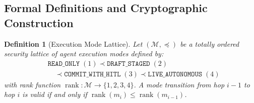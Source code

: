 \documentclass[conference,10pt]{IEEEtran}
\newtheorem{definition}{Definition}
\begin{document}
\subsection{Formal Definitions and Cryptographic Construction}

\begin{definition}[Execution Mode Lattice]
\label{def:lattice}
Let $(\mathcal{M}, \preceq)$ be a totally ordered security lattice of agent execution modes defined by:
{\footnotesize
\begin{equation}
\begin{aligned}
&\texttt{READ\_ONLY}\;(1) \prec \texttt{DRAFT\_STAGED}\;(2) \\
&\quad \prec \texttt{COMMIT\_WITH\_HITL}\;(3) \prec \texttt{LIVE\_AUTONOMOUS}\;(4)
\end{aligned}
\end{equation}}
with rank function $\operatorname{rank}: \mathcal{M} \to \{1, 2, 3, 4\}$. A mode transition from hop $i-1$ to hop $i$ is valid if and only if $\operatorname{rank}(m_i) \le \operatorname{rank}(m_{i-1})$.
\end{definition}
\end{document}
